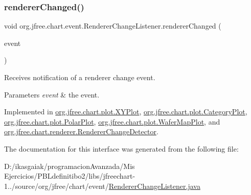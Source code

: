 \subsubsection{\texorpdfstring{renderer\+Changed()}{rendererChanged()}}
{\footnotesize\ttfamily void org.\+jfree.\+chart.\+event.\+Renderer\+Change\+Listener.\+renderer\+Changed (\begin{DoxyParamCaption}\item[{\mbox{\hyperlink{classorg_1_1jfree_1_1chart_1_1event_1_1_renderer_change_event}{Renderer\+Change\+Event}}}]{event }\end{DoxyParamCaption})}

Receives notification of a renderer change event.


\begin{DoxyParams}{Parameters}
{\em event} & the event. \\
\hline
\end{DoxyParams}


Implemented in \mbox{\hyperlink{classorg_1_1jfree_1_1chart_1_1plot_1_1_x_y_plot_ae220bdb4eb1ed66849c25b19b2e011bb}{org.\+jfree.\+chart.\+plot.\+X\+Y\+Plot}}, \mbox{\hyperlink{classorg_1_1jfree_1_1chart_1_1plot_1_1_category_plot_aa6fdcb1c98c07059522ece57a89b37b8}{org.\+jfree.\+chart.\+plot.\+Category\+Plot}}, \mbox{\hyperlink{classorg_1_1jfree_1_1chart_1_1plot_1_1_polar_plot_a1e6333d6d221bf28fa136ffa681a0a16}{org.\+jfree.\+chart.\+plot.\+Polar\+Plot}}, \mbox{\hyperlink{classorg_1_1jfree_1_1chart_1_1plot_1_1_wafer_map_plot_a82a5490640ce4300ff05197355d1e7fd}{org.\+jfree.\+chart.\+plot.\+Wafer\+Map\+Plot}}, and \mbox{\hyperlink{classorg_1_1jfree_1_1chart_1_1renderer_1_1_renderer_change_detector_ab2812d7623a94fe91b0bc0ac708989df}{org.\+jfree.\+chart.\+renderer.\+Renderer\+Change\+Detector}}.



The documentation for this interface was generated from the following file\+:\begin{DoxyCompactItemize}
\item 
D\+:/ikasgaiak/programacion\+Avanzada/\+Mis Ejercicios/\+P\+B\+Ldefinitibo2/libs/jfreechart-\/1../source/org/jfree/chart/event/\mbox{\hyperlink{_renderer_change_listener_8java}{Renderer\+Change\+Listener.\+java}}\end{DoxyCompactItemize}
